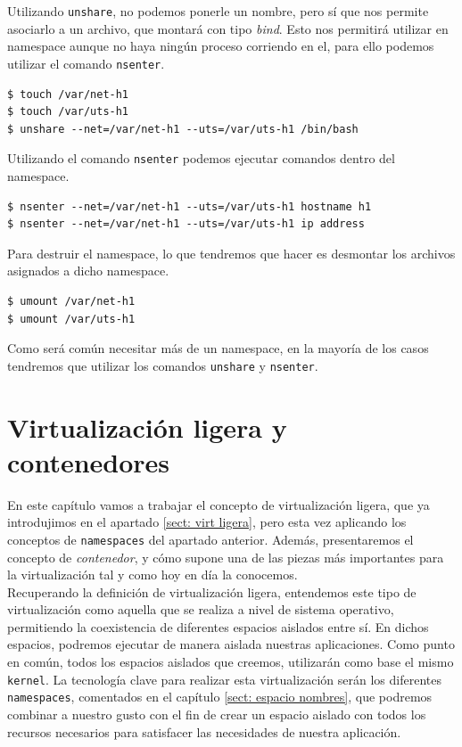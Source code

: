 \documentclass[a4paper, oneside, 12pt]{book}
\begin{document}
	\noindent Utilizando \texttt{unshare}, no podemos ponerle un nombre, pero sí que nos permite asociarlo a un archivo, que montará con tipo \textit{bind}. Esto nos permitirá utilizar en namespace aunque no haya ningún proceso corriendo en el, para ello podemos utilizar el comando \texttt{nsenter}.
	\begin{verbatim}
$ touch /var/net-h1
$ touch /var/uts-h1
$ unshare --net=/var/net-h1 --uts=/var/uts-h1 /bin/bash
	\end{verbatim}

	\noindent Utilizando el comando \texttt{nsenter} podemos ejecutar comandos dentro del namespace.
	\begin{verbatim}
$ nsenter --net=/var/net-h1 --uts=/var/uts-h1 hostname h1
$ nsenter --net=/var/net-h1 --uts=/var/uts-h1 ip address
	\end{verbatim}

	\noindent Para destruir el namespace, lo que tendremos que hacer es desmontar los archivos asignados a dicho namespace.
	\begin{verbatim}
$ umount /var/net-h1
$ umount /var/uts-h1
	\end{verbatim}

	\noindent Como será común necesitar más de un namespace, en la mayoría de los casos tendremos que utilizar los comandos \texttt{unshare} y \texttt{nsenter}.

	\pagebreak
	
	\chapter{Virtualización ligera y contenedores}
	\label{sec: virt ligera y contenedores}
	
	\noindent En este capítulo vamos a trabajar el concepto de virtualización ligera, que ya introdujimos en el apartado \ref{sect: virt ligera}, pero esta vez aplicando los conceptos de \texttt{namespaces} del apartado anterior. Además, presentaremos el concepto de \textit{contenedor}, y cómo supone una de las piezas más importantes para la virtualización tal y como hoy en día la conocemos. \\
	
	\noindent Recuperando la definición de virtualización ligera, entendemos este tipo de virtualización como aquella que se realiza a nivel de sistema operativo, permitiendo la coexistencia de diferentes espacios aislados entre sí. En dichos espacios, podremos ejecutar de manera aislada nuestras aplicaciones. Como punto en común, todos los espacios aislados que creemos, utilizarán como base el mismo \texttt{kernel}. La tecnología clave para realizar esta virtualización serán los diferentes \texttt{namespaces}, comentados en el capítulo \ref{sect: espacio nombres}, que podremos combinar a nuestro gusto con el fin de crear un espacio aislado con todos los recursos necesarios para satisfacer las necesidades de nuestra aplicación. \\
	
\end{document}
